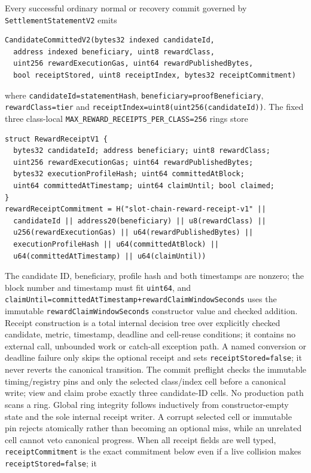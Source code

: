 \documentclass[a4paper,11pt]{article}
\newcommand{\code}[1]{\nolinkurl{#1}}
\begin{document}
Every successful ordinary normal or recovery commit governed by
\code{SettlementStatementV2} emits
\begin{verbatim}
CandidateCommittedV2(bytes32 indexed candidateId,
  address indexed beneficiary, uint8 rewardClass,
  uint256 rewardExecutionGas, uint64 rewardPublishedBytes,
  bool receiptStored, uint8 receiptIndex, bytes32 receiptCommitment)
\end{verbatim}
where \code{candidateId=statementHash}, \code{beneficiary=proofBeneficiary},
\code{rewardClass=tier} and
\code{receiptIndex=uint8(uint256(candidateId))}.  The fixed
three class-local \code{MAX_REWARD_RECEIPTS_PER_CLASS=256} rings store
\begin{verbatim}
struct RewardReceiptV1 {
  bytes32 candidateId; address beneficiary; uint8 rewardClass;
  uint256 rewardExecutionGas; uint64 rewardPublishedBytes;
  bytes32 executionProfileHash; uint64 committedAtBlock;
  uint64 committedAtTimestamp; uint64 claimUntil; bool claimed;
}
rewardReceiptCommitment = H("slot-chain-reward-receipt-v1" ||
  candidateId || address20(beneficiary) || u8(rewardClass) ||
  u256(rewardExecutionGas) || u64(rewardPublishedBytes) ||
  executionProfileHash || u64(committedAtBlock) ||
  u64(committedAtTimestamp) || u64(claimUntil))
\end{verbatim}
The candidate ID, beneficiary, profile hash and both timestamps are nonzero;
the block number and timestamp must fit \code{uint64}, and
\code{claimUntil=committedAtTimestamp+rewardClaimWindowSeconds} uses the
immutable \code{rewardClaimWindowSeconds} constructor value and checked
addition.  Receipt construction
is a total internal decision tree over explicitly checked candidate, metric,
timestamp, deadline and cell-reuse conditions; it contains no external call,
unbounded work or catch-all exception path.  A named conversion or deadline
failure only skips the optional receipt and sets \code{receiptStored=false}; it
never reverts the canonical transition.  The commit preflight checks the
immutable timing/registry pins and only the selected class/index cell before a
canonical write; view and claim probe exactly three candidate-ID cells.  No
production path scans a ring.  Global ring integrity follows inductively from
constructor-empty state and the sole internal receipt writer.  A corrupt
selected cell or immutable pin rejects atomically rather than becoming an
optional miss, while an unrelated cell cannot veto canonical progress.
When all receipt fields are well typed, \code{receiptCommitment} is the exact
commitment below even if a live collision makes \code{receiptStored=false}; it
\end{document}

